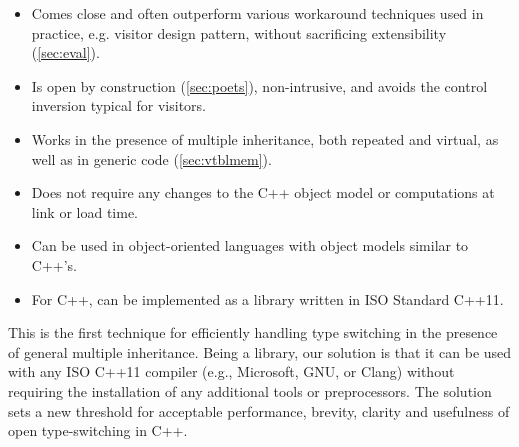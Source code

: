   \begin{itemize}
  \setlength{\itemsep}{0pt}
  \setlength{\parskip}{0pt}
  \item Comes close and often outperform various workaround techniques used in 
        practice, e.g. visitor design pattern, without sacrificing extensibility
        (\textsection\ref{sec:eval}). 
  \item Is open by construction (\textsection\ref{sec:poets}), non-intrusive, 
        and avoids the control inversion typical for visitors. 
  \item Works in the presence of multiple inheritance, both repeated and 
        virtual, as well as in generic code (\textsection\ref{sec:vtblmem}).
  \item Does not require any changes to the C++ object model or computations at 
        link or load time. 
  \item Can be used in object-oriented languages with 
        object models similar to C++'s.
  \item For C++, can be implemented as a library written in ISO Standard C++11.
  \end{itemize}

\noindent
This is the first technique for efficiently handling 
type switching in the presence of general multiple inheritance.
Being a library, our solution is that it can be used with any 
ISO C++11 compiler (e.g., Microsoft, GNU, or Clang) without requiring the installation of 
any additional tools or preprocessors. The solution
sets a new threshold for acceptable performance, brevity, clarity and usefulness of open type-switching in C++.

